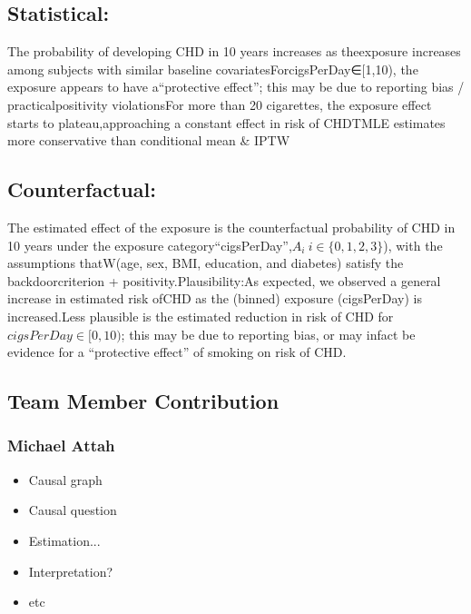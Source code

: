 \documentclass[]{article}
\begin{document}
\subsection{Statistical:}\label{statistical}

The probability of developing CHD in 10 years increases as theexposure
increases among subjects with similar baseline
covariatesForcigsPerDay∈{[}1,10), the exposure appears to have
a``protective effect''; this may be due to reporting bias /
practicalpositivity violationsFor more than 20 cigarettes, the exposure
effect starts to plateau,approaching a constant effect in risk of
CHDTMLE estimates more conservative than conditional mean \& IPTW

\subsection{Counterfactual:}\label{counterfactual}

The estimated effect of the exposure is the counterfactual probability
of CHD in 10 years under the exposure
category``cigsPerDay'',\(A_i \ i \in \{0,1,2,3\}\)), with the
assumptions thatW(age, sex, BMI, education, and diabetes) satisfy the
backdoorcriterion + positivity.Plausibility:As expected, we observed a
general increase in estimated risk ofCHD as the (binned) exposure
(cigsPerDay) is increased.Less plausible is the estimated reduction in
risk of CHD for \(cigsPerDay \in [0,10)\); this may be due to reporting
bias, or may infact be evidence for a ``protective effect'' of smoking
on risk of CHD.

\newpage

\subsection{Team Member Contribution}\label{team-member-contribution}

\subsubsection{Michael Attah}\label{michael-attah}

\begin{itemize}
\item Causal graph
\item Causal question
\item Estimation...
\item Interpretation?
\item etc
\end{itemize}
\end{document}
